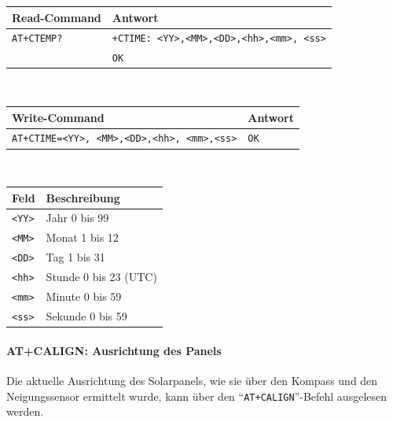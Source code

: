         \begin{table}[H]
            \centering
            \begin{tabular}{|p{}|p{}|}
                \hline
                \textbf{Read-Command} &\textbf{Antwort} \\
                \hline
                \texttt{AT+CTEMP?}  & \texttt{+CTIME: <YY>,<MM>,<DD>,<hh>,<mm>, <ss>}\\
                & \texttt{OK}\\
                \hline
            \end{tabular}\\[3mm]
            \begin{tabular}{|p{}|p{}|}
                \hline
                \textbf{Write-Command} &\textbf{Antwort} \\
                \hline
                \texttt{AT+CTIME=<YY>, <MM>,<DD>,<hh>, <mm>,<ss>} & \texttt{OK}\\
                \hline
            \end{tabular}\\[3mm]
            \begin{tabular}{|p{}|p{}|}
                \hline
                \textbf{Feld}       & \textbf{Beschreibung}\\
                \hline
                \texttt{<YY>}       & Jahr 0 bis 99 \\
                \texttt{<MM>}       & Monat 1 bis 12 \\
                \texttt{<DD>}       & Tag 1 bis 31 \\
                \texttt{<hh>}       & Stunde 0 bis 23 (UTC) \\
                \texttt{<mm>}       & Minute 0 bis 59 \\
                \texttt{<ss>}       & Sekunde 0 bis 59 \\
                \hline
            \end{tabular}
        \end{table}
    
        \paragraph{AT+CALIGN: Ausrichtung des Panels}
        Die aktuelle Ausrichtung des Solarpanels, wie sie über den Kompass und den Neigungssensor ermittelt wurde, kann über den ``\texttt{AT+CALIGN}''-Befehl ausgelesen werden.
        
